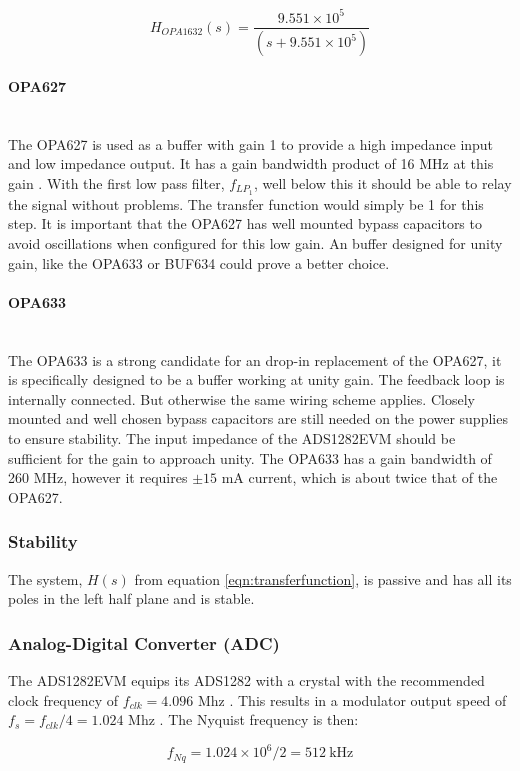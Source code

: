 \documentclass[a4paper]{article}
\begin{document}
\begin{multicols}{2}
\begin{equation}
  H_{OPA1632}(s) = \frac{9.551 \times 10^5}
                        {(s + 9.551 \times 10^5)}
  \label{eqn:opa1632_tf}
\end{equation}

\paragraph{OPA627} \ \\
The OPA627 is used as a buffer with gain 1 to provide a high impedance input and low
impedance output. It has a gain bandwidth product of 16 MHz at this
gain \cite{opa627_ds}. With the first low pass filter, $f_{LP_1}$, well
below this it should be able to relay the signal without problems. The
transfer function would simply be 1 for this step. It is important that
the OPA627 has well mounted bypass capacitors to avoid oscillations when
configured for this low gain. An buffer designed for unity gain, like
the OPA633 \cite{opa633_ds} or BUF634 \cite{buf634_ds} could prove a better choice.

\paragraph{OPA633} \ \\
The OPA633 \cite{opa633_ds} is a strong candidate for an drop-in replacement of the
OPA627, it is specifically designed to be a buffer working at unity
gain. The feedback loop is internally connected. But otherwise the same
wiring scheme applies. Closely mounted and well chosen bypass capacitors
are still needed on the power supplies to ensure stability. The input
impedance of the ADS1282EVM should be sufficient for the gain to
approach unity. The OPA633 has a gain bandwidth of 260 MHz, however it
requires $\pm 15$ mA current, which is about twice that of the OPA627.

\subsubsection{Stability}
The system, $H(s)$ from equation \eqref{eqn:transferfunction}, is
passive and has all
its poles in the left half plane and is stable.

\subsubsection{Analog-Digital Converter (ADC)}
The ADS1282EVM equips its ADS1282 with a crystal with the recommended clock frequency of
$f_{clk} = 4.096$ Mhz \cite{ads1282evm_ds}. This results in a modulator
output speed of $ f_s = f_{clk}/4 = 1.024$ Mhz \cite{ads1282_ds}. The
Nyquist frequency is then:

\begin{equation}
  f_{Nq} = 1.024 \times 10^6 / 2 = 512\ \text{kHz}
  \label{eqn:nyquist}
\end{equation}

\end{multicols}
\end{document}

